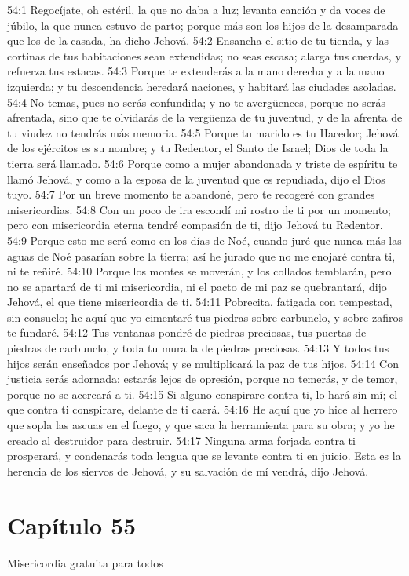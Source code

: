 54:1 Regocíjate, oh estéril, la que no daba a luz; levanta canción y da voces de júbilo, la que nunca estuvo de parto; porque más son los hijos de la desamparada que los de la casada, ha dicho Jehová. 
54:2 Ensancha el sitio de tu tienda, y las cortinas de tus habitaciones sean extendidas; no seas escasa; alarga tus cuerdas, y refuerza tus estacas. 
54:3 Porque te extenderás a la mano derecha y a la mano izquierda; y tu descendencia heredará naciones, y habitará las ciudades asoladas. 
54:4 No temas, pues no serás confundida; y no te avergüences, porque no serás afrentada, sino que te olvidarás de la vergüenza de tu juventud, y de la afrenta de tu viudez no tendrás más memoria. 
54:5 Porque tu marido es tu Hacedor; Jehová de los ejércitos es su nombre; y tu Redentor, el Santo de Israel; Dios de toda la tierra será llamado. 
54:6 Porque como a mujer abandonada y triste de espíritu te llamó Jehová, y como a la esposa de la juventud que es repudiada, dijo el Dios tuyo. 
54:7 Por un breve momento te abandoné, pero te recogeré con grandes misericordias. 
54:8 Con un poco de ira escondí mi rostro de ti por un momento; pero con misericordia eterna tendré compasión de ti, dijo Jehová tu Redentor. 
54:9 Porque esto me será como en los días de Noé, cuando juré que nunca más las aguas de Noé pasarían sobre la tierra; así he jurado que no me enojaré contra ti, ni te reñiré. 
54:10 Porque los montes se moverán, y los collados temblarán, pero no se apartará de ti mi misericordia, ni el pacto de mi paz se quebrantará, dijo Jehová, el que tiene misericordia de ti. 
54:11 Pobrecita, fatigada con tempestad, sin consuelo; he aquí que yo cimentaré tus piedras sobre carbunclo, y sobre zafiros te fundaré. 
54:12 Tus ventanas pondré de piedras preciosas, tus puertas de piedras de carbunclo, y toda tu muralla de piedras preciosas. 
54:13 Y todos tus hijos serán enseñados por Jehová; y se multiplicará la paz de tus hijos. 
54:14 Con justicia serás adornada; estarás lejos de opresión, porque no temerás, y de temor, porque no se acercará a ti. 
54:15 Si alguno conspirare contra ti, lo hará sin mí; el que contra ti conspirare, delante de ti caerá. 
54:16 He aquí que yo hice al herrero que sopla las ascuas en el fuego, y que saca la herramienta para su obra; y yo he creado al destruidor para destruir. 
54:17 Ninguna arma forjada contra ti prosperará, y condenarás toda lengua que se levante contra ti en juicio. Esta es la herencia de los siervos de Jehová, y su salvación de mí vendrá, dijo Jehová. 
\section*{Capítulo 55 }
Misericordia gratuita para todos 
 
